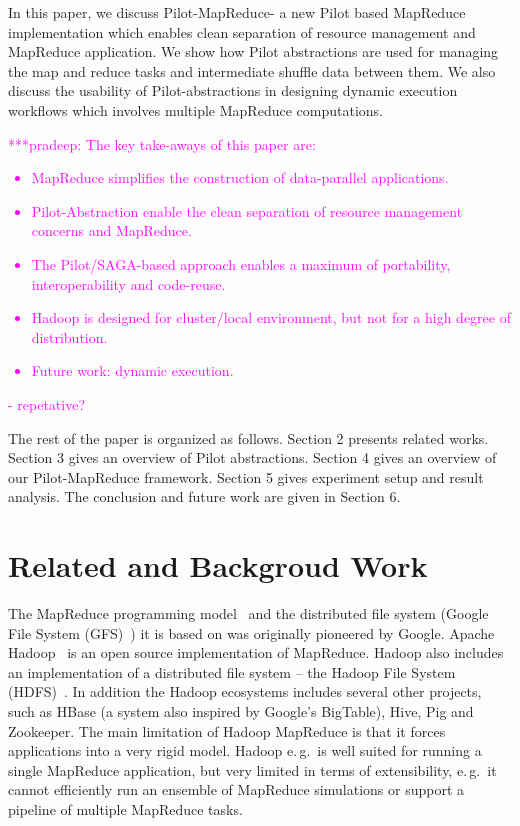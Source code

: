 \documentclass{acm_proc_article-sp}
\newcommand{\pnote}[1]{ {\textcolor{magenta} { ***pradeep: #1 }}}
\newcommand{\pnote}[1]{}
\newcommand{\pilot}{Pilot\xspace}
\newcommand{\pilotmapreduce}{Pilot-MapReduce\xspace}
\begin{document}
In this paper, we discuss \pilotmapreduce- a new \pilot based MapReduce
implementation which enables clean separation of resource
management and MapReduce application. We show
how \pilot abstractions are used for managing the map and reduce tasks and
intermediate shuffle data between them. We also discuss the usability of \pilot-abstractions
in designing dynamic execution workflows which involves multiple MapReduce computations. 

\pnote{The key take-aways of this paper are:
\begin{itemize}
	\item MapReduce simplifies the construction of data-parallel applications.
	\item Pilot-Abstraction enable the clean separation of resource management concerns and MapReduce.
	\item The Pilot/SAGA-based approach enables a maximum of portability, interoperability and code-reuse.
	\item Hadoop is designed for cluster/local environment, but not for a high degree of distribution.
	\item Future work: dynamic execution.
\end{itemize}  - repetative? }

The rest of the paper is organized as follows. Section 2 presents related works. Section 3 gives an overview of \pilot abstractions. Section 4 gives an overview of our \pilotmapreduce framework. Section 5 gives experiment setup and result analysis. The conclusion and future work are given in Section 6.

\section{Related and Backgroud Work}

The MapReduce programming model~\cite{Dean:2004:MSD:1251254.1251264}
and the distributed file system (Google File System
(GFS)~\cite{Ghemawat:2003:GFS:1165389.945450}) it is based on was
originally pioneered by Google. Apache Hadoop~\cite{hadoop} is an open
source implementation of MapReduce. Hadoop also includes an
implementation of a distributed file system -- the Hadoop File System
(HDFS)~\cite{Borthakur:2007fk}. In addition the Hadoop ecosystems
includes several other projects, such as HBase (a system also inspired
by Google's BigTable), Hive, Pig and Zookeeper. The main limitation of
Hadoop MapReduce is that it forces applications into a very rigid
model. Hadoop e.\,g.\ is well suited for running a single MapReduce
application, but very limited in terms of extensibility, e.\,g.\ it
cannot efficiently run an ensemble of MapReduce simulations or support
a pipeline of multiple MapReduce tasks.
\end{document}
